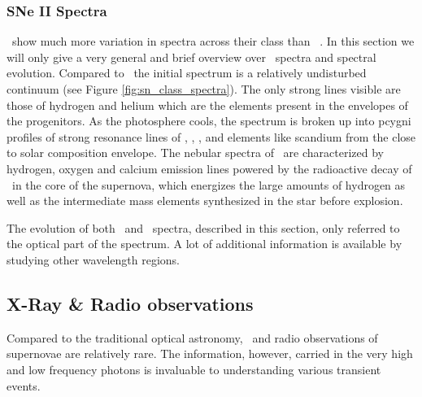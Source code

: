 \subsubsection{SNe II Spectra}
\sneii\ show much more variation in spectra across their class than \sneia\ . In this section we will only give a very general and brief overview over \sneii\ spectra and spectral evolution. 
Compared to \sneia\ the initial spectrum is a relatively undisturbed continuum (see Figure \ref{fig:sn_class_spectra}). The only strong lines visible are those of hydrogen and helium which are the elements present in the envelopes of the progenitors. 
As the photosphere cools, the spectrum is broken up into \Gls{pcygni} profiles of strong resonance lines of , , , and elements like scandium from the close to solar composition envelope. The nebular spectra of \sneii\ are characterized by hydrogen, oxygen and calcium emission lines powered by the radioactive decay of \Ni\ in the core of the supernova, which energizes the large amounts of hydrogen as well as the intermediate mass elements synthesized in the star before explosion.

The evolution of both \sneia\ and \sneii\ spectra, described in this section, only referred to the optical part of the spectrum. A lot of additional information is available by studying other wavelength regions.

\subsection{X-Ray \& Radio observations}

Compared to the traditional optical astronomy, \xray\ and radio observations of supernovae are relatively rare. The information, however, carried in the very high and low frequency photons is invaluable to understanding various transient events. 

